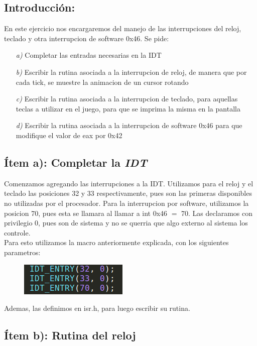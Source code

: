 \subsection{Introducción:}

En este ejercicio nos encargaremos del manejo de las interrupciones del reloj, teclado y otra interrupcion de software 0x46. Se pide:

\begin{itemize}
\item [\textit{a)}] Completar las entradas necesarias en la IDT
\item [\textit{b)}] Escribir la rutina asociada a la interrupcion de reloj, de manera que por cada tick, se muestre la animacion de un cursor rotando
\item [\textit{c)}]  Escribir la rutina asociada a la interrupcion de teclado, para aquellas teclas a utilizar en el juego, para que se imprima la misma en la pantalla
\item [\textit{d)}] Escribir la rutina asociada a la interrupcion de software 0x46 para que modifique el valor de eax por 0x42
\end{itemize}



\subsection{Ítem a): Completar la \textit{IDT}}

Comenzamos agregando las interrupciones a la IDT. Utilizamos para el reloj y el teclado las posiciones 32 y 33 respectivamente, pues son las primeras disponibles no utilizadas por el procesador. Para la interrupcion por software, utilizamos la posicion 70, pues esta se llamara al llamar a int 0x46 $=$ 70. Las declaramos con privilegio 0, pues son de sistema y no se querria que algo externo al sistema los controle. \\
Para esto utilizamos la macro anteriormente explicada, con los siguientes parametros:

\begin{figure}[H]
\begin{center}
  \includegraphics[width=\linewidth]{ejercicio5/idt.png}
\endminipage
\end{center}
\end{figure}

Ademas, las definimos en isr.h, para luego escribir su rutina.


\subsection{Ítem b): Rutina del reloj}

